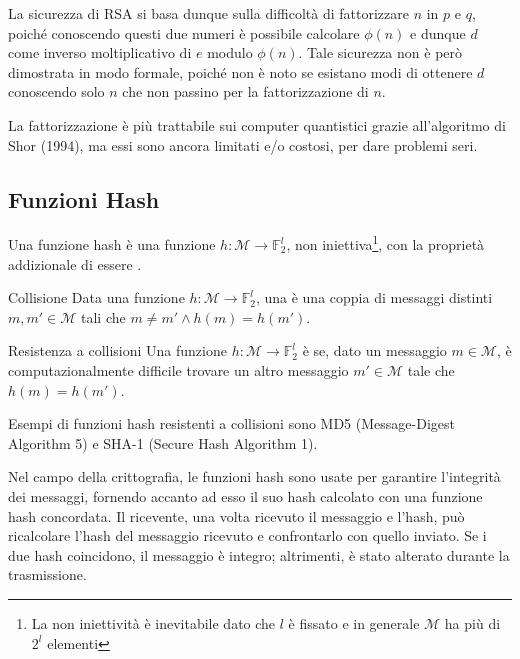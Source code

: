 La sicurezza di RSA si basa dunque sulla difficoltà di fattorizzare \(n\) in \(p\) e \(q\), poiché conoscendo questi due numeri è possibile calcolare \(\phi(n)\) e dunque \(d\) come inverso moltiplicativo di \(e\) modulo \(\phi(n)\).
Tale sicurezza non è però dimostrata in modo formale, poiché non è noto se esistano modi di ottenere \(d\) conoscendo solo \(n\) che non passino per la fattorizzazione di \(n\).

\begin{observation}{}
  La fattorizzazione è più trattabile sui computer quantistici grazie all'algoritmo di Shor (1994), ma essi sono ancora limitati e/o costosi, per dare problemi seri.
\end{observation}

\subsection{Funzioni Hash}

Una funzione hash è una funzione \(h: \mathcal{M} \to \mathbb{F}_2^l\), non iniettiva\footnote{La non iniettività è inevitabile dato che \(l\) è fissato e in generale \(\mathcal{M}\) ha più di \(2^l\) elementi}, con la proprietà addizionale di essere .

\begin{definition}{Collisione}
  Data una funzione \(h: \mathcal{M} \to \mathbb{F}_2^l\), una  è una coppia di messaggi distinti \(m,m' \in \mathcal{M}\) tali che \(m\neq m' \land h(m) = h(m')\).
\end{definition}

\begin{definition}{Resistenza a collisioni}
  Una funzione \(h: \mathcal{M} \to \mathbb{F}_2^l\) è  se, dato un messaggio \(m \in \mathcal{M}\), è computazionalmente difficile trovare un altro messaggio \(m' \in \mathcal{M}\) tale che \(h(m) = h(m')\).
\end{definition}

Esempi di funzioni hash resistenti a collisioni sono MD5 (Message-Digest Algorithm 5) e SHA-1 (Secure Hash Algorithm 1).

Nel campo della crittografia, le funzioni hash sono usate per garantire l'integrità dei messaggi, fornendo accanto ad esso il suo hash calcolato con una funzione hash concordata.
Il ricevente, una volta ricevuto il messaggio e l'hash, può ricalcolare l'hash del messaggio ricevuto e confrontarlo con quello inviato.
Se i due hash coincidono, il messaggio è integro; altrimenti, è stato alterato durante la trasmissione.

